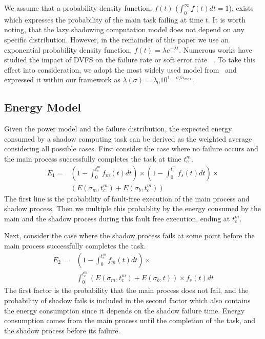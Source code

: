 We assume that a probability density function, $f(t)$ ($\int_0^\infty
f(t)dt=1$), exists which expresses the probability of the main task
failing at time $t$. 
It is worth noting, that the lazy shadowing computation model 
does not depend on any specific distribution. However, in the remainder of this 
paper we use an exponential probability density function, $f(t) = \lambda e^{-\lambda t}$.
Numerous works have
studied the impact of DVFS on the failure rate or soft error rate
~\cite{firouzi2010reliability,zhu2004effects}. To take this effect into consideration,
we adopt the most widely used model from~\cite{zhu2004effects} and expressed it
within our framework as $\lambda(\sigma) = \lambda_0 10^{1-\sigma/\sigma_{max}}$. 



\subsection{Energy Model}
\label{energy_model}

Given the power model and the failure distribution, the expected
energy consumed by a shadow computing task can be derived as the weighted
average considering all possible cases. 
First consider the case where no failure occurs and the main process
successfully completes the task at time $t_c^m$.
\begin{equation}
\begin{split}
E_1 = &  ( 1-\int_0^{t_c^m}f_m(t)dt) \times (1 - \int_0^{t_c^m} f_s(t)dt) \times \\
      &  (  E(\sigma_m,t_c^m) + E(\sigma_b,t_c^m))
\label{eq:energy_no_failure}
\end{split}
\end{equation}
The first line is the probability of fault-free execution of the main
process and shadow process. Then we multiple this probablity by the
energy consumed by the main and the shadow process during this fault
free execution, ending at $t_c^m$.

Next, consider the case where the shadow process fails at some point
before the main process successfully completes the task.
\begin{equation}
\begin{split}
E_2 = & (1-\int_0^{t_c^m}f_m(t)dt) \times \\
      & \int_0^{t_c^m}(E(\sigma_m,t_c^m)+E(\sigma_b,t)) \times f_s(t)dt
\label{eq:energy_shadow_fail}
\end{split}
\end{equation}
The first factor is the probability that the main process does not
fail, and the probability of shadow fails is included in the second factor which also contains the energy consumption since it depends on the shadow failure time. Energy consumption comes from the main process until the completion of the task,
and the shadow process before its failure.

